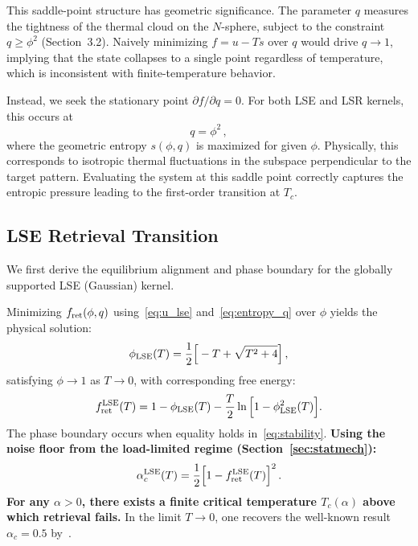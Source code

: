 \documentclass{article}
\theoremstyle{plain}
\theoremstyle{definition}
\theoremstyle{remark}
\begin{document}
This saddle-point structure has geometric significance. The parameter $q$ measures the tightness of the thermal cloud on the $N$-sphere, subject to the constraint $q \ge \phi^2$ (Section~3.2). Naively minimizing $f = u - Ts$ over $q$ would drive $q \to 1$, implying that the state collapses to a single point regardless of temperature, which is inconsistent with finite-temperature behavior.

Instead, we seek the stationary point $\partial f / \partial q = 0$. For both LSE and LSR kernels, this occurs at 
\begin{equation}
    q = \phi^2\,,
    \label{eq:q_constraint}
\end{equation}
where the geometric entropy $s(\phi, q)$ is maximized for given $\phi$. Physically, this corresponds to isotropic thermal fluctuations in the subspace perpendicular to the target pattern. Evaluating the system at this saddle point correctly captures the entropic pressure leading to the first-order transition at $T_c$.

\subsection{\textbf{LSE Retrieval Transition}}
We first derive the equilibrium alignment and phase boundary for the globally supported LSE (Gaussian) kernel.

Minimizing $f_{\rm ret}(\phi, q)$ using~\eqref{eq:u_lse} and~\eqref{eq:entropy_q} over $\phi$ yields the physical solution:
\begin{equation}
    \phi_{\rm LSE}(T) = \frac{1}{2} \Big[-T + \sqrt{T^2 + 4}\Big]\,,
    \label{eq:phi_lse}
\end{equation}
satisfying $\phi \to 1$ as $T \to 0$, with corresponding free energy:
\begin{equation}
    f_{\rm ret}^{\rm LSE}(T) = 1 - \phi_{\rm LSE}(T) - \frac{T}{2}\ln\Big[1 - \phi^2_{\rm LSE}(T)\Big].
    \label{eq:f_lse}
\end{equation}
The phase boundary occurs when equality holds in~\eqref{eq:stability}. \textbf{Using the noise floor from the load-limited regime (Section~\ref{sec:statmech}):}
\begin{equation}
    \alpha_c^{\rm LSE}(T) = \frac{1}{2} \Big[1 - f_{\rm ret}^{\rm LSE}(T) \Big]^2\,.
    \label{eq:alpha_lse}
\end{equation}
\textbf{For any $\alpha > 0$, there exists a finite critical temperature $T_c(\alpha)$ above which retrieval fails.} In the limit $T \to 0$, one recovers the well-known result $\alpha_c = 0.5$ by~\citet{ramsauer2021hopfield}.
\end{document}
